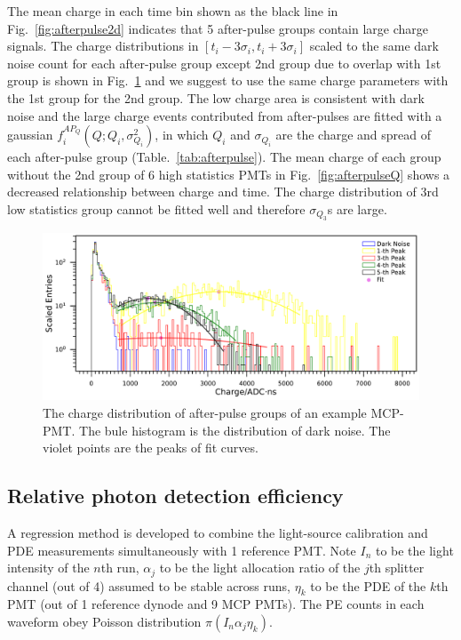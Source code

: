The mean charge in each time bin shown as the black line in Fig.~\ref{fig:afterpulse2d} indicates that 5 after-pulse groups contain large charge signals. The charge distributions in $[t_i-3\sigma_i,t_i+3\sigma_i]$ scaled to the same dark noise count for each after-pulse group except 2nd group due to overlap with 1st group is shown in Fig.~\ref{fig:afterpulsecharge} and we suggest to use the same charge parameters with the 1st group for the 2nd group. The low charge area is consistent with dark noise and the large charge events contributed from after-pulses are fitted with a gaussian $f^{AP_Q}_i(Q;Q_i,\sigma_{Q_i}^2)$, in which $Q_i$ and $\sigma_{Q_i}$ are the charge and spread of each after-pulse group (Table.~\ref{tab:afterpulse}). The mean charge of each group without the 2nd group of 6 high statistics PMTs in Fig.~\ref{fig:afterpulseQ} shows a decreased relationship between charge and time. The charge distribution of 3rd low statistics group cannot be fitted well and therefore $\sigma_{Q_3}$s are large. 

\begin{figure}[!htbp]
    \centering
    \includegraphics[width=\textwidth]{figures/method/triggerafterpulseCharge.pdf}
    \caption{The charge distribution of after-pulse groups of an example MCP-PMT. The bule histogram is the distribution of dark noise. The violet points are the peaks of fit curves.}
    \label{fig:afterpulsecharge}
\end{figure}

\subsection{Relative photon detection efficiency}
\label{sec:PDE}
A regression method is developed to combine the light-source calibration and PDE measurements simultaneously with 1 reference PMT. Note $I_n$ to be the light intensity of the $n$th run, $\alpha_j$ to be the light allocation ratio of the $j$th splitter channel (out of 4) assumed to be stable across runs, $\eta_k$ to be the PDE of the $k$th PMT (out of 1 reference dynode and 9 MCP PMTs). The PE counts in each waveform obey Poisson distribution $\pi(I_n\alpha_j\eta_k)$.

